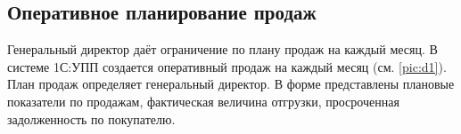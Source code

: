\newpage
\subsection{Оперативное планирование продаж}
\label{bp:salesplan}




Генеральный директор даёт ограничение по плану продаж на каждый месяц.
В системе 1С:УПП создается оперативный продаж на каждый месяц (см. \ref{pic:d1}).
План продаж определяет генеральный директор.
В форме представлены плановые показатели по продажам, фактическая величина отгрузки, просроченная задолженность по покупателю.











 
 

